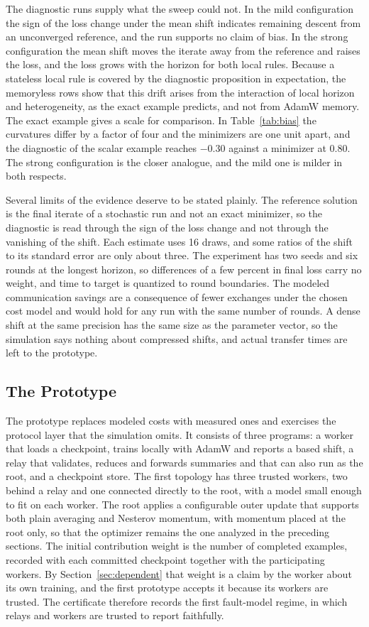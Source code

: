 \documentclass[11pt]{article}
\theoremstyle{definition}
\theoremstyle{remark}
\begin{document}
The diagnostic runs supply what the sweep could not. In the mild configuration the sign of the loss change under the mean shift indicates remaining descent from an unconverged reference, and the run supports no claim of bias. In the strong configuration the mean shift moves the iterate away from the reference and raises the loss, and the loss grows with the horizon for both local rules. Because a stateless local rule is covered by the diagnostic proposition in expectation, the memoryless rows show that this drift arises from the interaction of local horizon and heterogeneity, as the exact example predicts, and not from AdamW memory. The exact example gives a scale for comparison. In Table~\ref{tab:bias} the curvatures differ by a factor of four and the minimizers are one unit apart, and the diagnostic of the scalar example reaches $-0.30$ against a minimizer at $0.80$. The strong configuration is the closer analogue, and the mild one is milder in both respects.

Several limits of the evidence deserve to be stated plainly. The reference solution is the final iterate of a stochastic run and not an exact minimizer, so the diagnostic is read through the sign of the loss change and not through the vanishing of the shift. Each estimate uses 16 draws, and some ratios of the shift to its standard error are only about three. The experiment has two seeds and six rounds at the longest horizon, so differences of a few percent in final loss carry no weight, and time to target is quantized to round boundaries. The modeled communication savings are a consequence of fewer exchanges under the chosen cost model and would hold for any run with the same number of rounds. A dense shift at the same precision has the same size as the parameter vector, so the simulation says nothing about compressed shifts, and actual transfer times are left to the prototype.

\subsection{The Prototype}

The prototype replaces modeled costs with measured ones and exercises the protocol layer that the simulation omits. It consists of three programs: a worker that loads a checkpoint, trains locally with AdamW and reports a based shift, a relay that validates, reduces and forwards summaries and that can also run as the root, and a checkpoint store. The first topology has three trusted workers, two behind a relay and one connected directly to the root, with a model small enough to fit on each worker. The root applies a configurable outer update that supports both plain averaging and Nesterov momentum, with momentum placed at the root only, so that the optimizer remains the one analyzed in the preceding sections. The initial contribution weight is the number of completed examples, recorded with each committed checkpoint together with the participating workers. By Section~\ref{sec:dependent} that weight is a claim by the worker about its own training, and the first prototype accepts it because its workers are trusted. The certificate therefore records the first fault-model regime, in which relays and workers are trusted to report faithfully.
\end{document}

